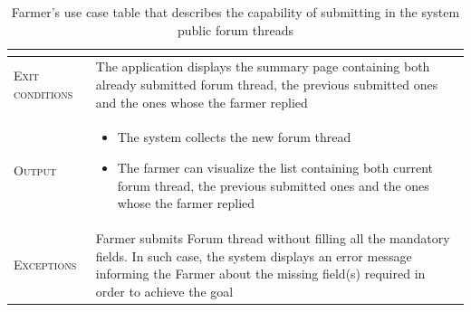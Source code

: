 \begin{table}[H]
\begin{tabular}{|l|p{}|}
\begin{itemize}
                                        \end{itemize}\\
        \hline %
        \textsc{Exit conditions}    &  The application displays the summary page containing both already submitted forum thread, the previous submitted ones and the ones whose the farmer replied\\
    	\hline %
    	\textsc{Output}             &  \begin{itemize}
    	    \item The system collects the new forum thread
    	    \item The farmer can visualize the list containing both current forum thread, the previous submitted ones and the ones whose the farmer replied
    	\end{itemize}\\
    	\hline %
    	\textsc{Exceptions}         &   Farmer submits Forum thread without filling all the mandatory fields. In such case, the system displays an error message informing the Farmer about the missing field(s) required in order to achieve the goal\\
    	\hline %
        
    \end{tabular}

\caption{\label{tab:Forum_generation}Farmer's use case table that describes the capability of submitting in the system public forum threads}
\end{table}

